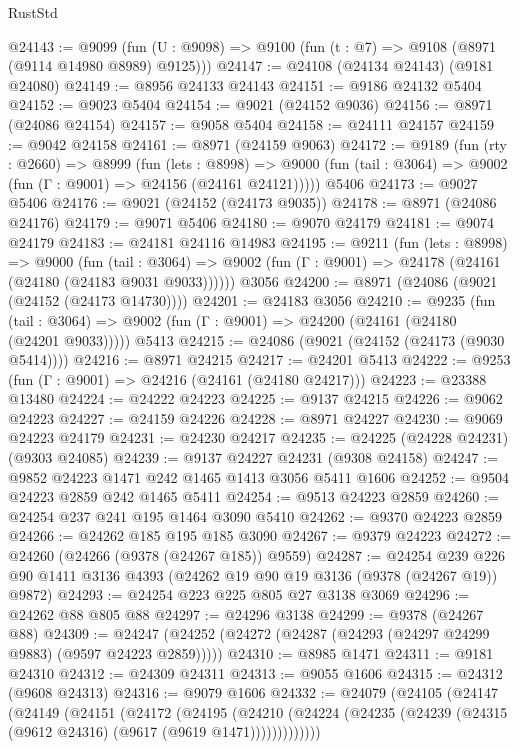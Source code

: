 \begin{lexlean}{RustStd}
\begin{coremodule}
@24143 := @9099
    (fun (U : @9098) => @9100 (fun (t : @7) => @9108 (@8971 (@9114 @14980 @8989) @9125)))
@24147 := @24108 (@24134 @24143) (@9181 @24080)
@24149 := @8956 @24133 @24143
@24151 := @9186 @24132 @5404
@24152 := @9023 @5404
@24154 := @9021 (@24152 @9036)
@24156 := @8971 (@24086 @24154)
@24157 := @9058 @5404
@24158 := @24111 @24157
@24159 := @9042 @24158
@24161 := @8971 (@24159 @9063)
@24172 := @9189
    (fun (rty : @2660) =>
    @8999
      (fun (lets : @8998) =>
      @9000 (fun (tail : @3064) => @9002 (fun (Γ : @9001) => @24156 (@24161 @24121)))))
    @5406
@24173 := @9027 @5406
@24176 := @9021 (@24152 (@24173 @9035))
@24178 := @8971 (@24086 @24176)
@24179 := @9071 @5406
@24180 := @9070 @24179
@24181 := @9074 @24179
@24183 := @24181 @24116 @14983
@24195 := @9211
    (fun (lets : @8998) =>
    @9000
      (fun (tail : @3064) =>
      @9002 (fun (Γ : @9001) => @24178 (@24161 (@24180 (@24183 @9031 @9033))))))
    @3056
@24200 := @8971 (@24086 (@9021 (@24152 (@24173 @14730))))
@24201 := @24183 @3056
@24210 := @9235
    (fun (tail : @3064) => @9002 (fun (Γ : @9001) => @24200 (@24161 (@24180 (@24201 @9033)))))
    @5413
@24215 := @24086 (@9021 (@24152 (@24173 (@9030 @5414))))
@24216 := @8971 @24215
@24217 := @24201 @5413
@24222 := @9253 (fun (Γ : @9001) => @24216 (@24161 (@24180 @24217)))
@24223 := @23388 @13480
@24224 := @24222 @24223
@24225 := @9137 @24215
@24226 := @9062 @24223
@24227 := @24159 @24226
@24228 := @8971 @24227
@24230 := @9069 @24223 @24179
@24231 := @24230 @24217
@24235 := @24225 (@24228 @24231) (@9303 @24085)
@24239 := @9137 @24227 @24231 (@9308 @24158)
@24247 := @9852 @24223 @1471 @242 @1465 @1413 @3056 @5411 @1606
@24252 := @9504 @24223 @2859 @242 @1465 @5411
@24254 := @9513 @24223 @2859
@24260 := @24254 @237 @241 @195 @1464 @3090 @5410
@24262 := @9370 @24223 @2859
@24266 := @24262 @185 @195 @185 @3090
@24267 := @9379 @24223
@24272 := @24260 (@24266 (@9378 (@24267 @185)) @9559)
@24287 := @24254
    @239
    @226
    @90
    @1411
    @3136
    @4393
    (@24262 @19 @90 @19 @3136 (@9378 (@24267 @19)) @9872)
@24293 := @24254 @223 @225 @805 @27 @3138 @3069
@24296 := @24262 @88 @805 @88
@24297 := @24296 @3138
@24299 := @9378 (@24267 @88)
@24309 := @24247 (@24252 (@24272 (@24287 (@24293 (@24297 @24299 @9883) (@9597 @24223 @2859)))))
@24310 := @8985 @1471
@24311 := @9181 @24310
@24312 := @24309 @24311
@24313 := @9055 @1606
@24315 := @24312 (@9608 @24313)
@24316 := @9079 @1606
@24332 := @24079
    (@24105
      (@24147
        (@24149
          (@24151
            (@24172
              (@24195
                (@24210
                  (@24224 (@24235 (@24239 (@24315 (@9612 @24316) (@9617 (@9619 @1471)))))))))))))

\end{coremodule}
\end{lexlean}
